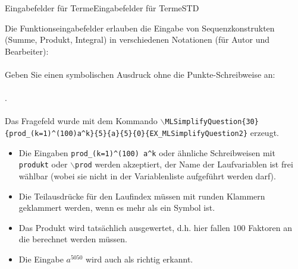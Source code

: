 \begin{MXContent}{Eingabefelder für Terme}{Eingabefelder für Terme}{STD}
\begin{MExample}
Die Funktionseingabefelder erlauben die Eingabe von Sequenzkonstrukten (Summe, Produkt, Integral) in verschiedenen Notationen (für Autor und Bearbeiter):
\ \\ \ \\
Geben Sie einen symbolischen Ausdruck ohne die Punkte-Schreibweise an:
\ \\ \ \\
.
\ \\ \ \ \\
Das Fragefeld wurde mit dem Kommando \texttt{$\backslash$MLSimplifyQuestion\{30\}\{prod\_(k=1)\^{}(100)a\^{}k\}\{5\}\{a\}\{5\}\{0\}\{EX\_MLSimplifyQuestion2\}} erzeugt.
 \ \\
\begin{itemize}
\item{Die Eingaben \texttt{prod\_(k=1)\^{}(100) a\^{}k} oder ähnliche Schreibweisen mit \texttt{produkt} oder \texttt{$\backslash$prod} werden akzeptiert, der Name der Laufvariablen ist frei wählbar (wobei sie nicht in der Variablenliste aufgeführt werden darf).}
\item{Die Teilausdrücke für den Laufindex müssen mit runden Klammern geklammert werden, wenn es mehr als ein Symbol ist.}
\item{Das Produkt wird tatsächlich ausgewertet, d.h. hier fallen $100$ Faktoren an die berechnet werden müssen.}
\item{Die Eingabe $a^{5050}$ wird auch als richtig erkannt.}
\end{itemize}
\end{MExample}

\end{MXContent}

